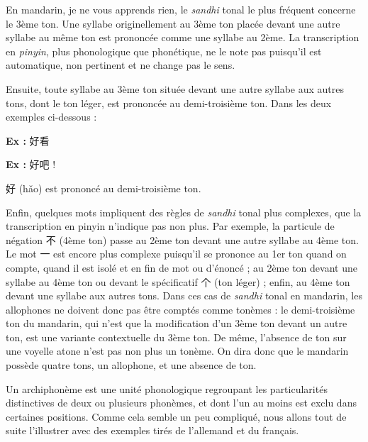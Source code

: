 En mandarin, je ne vous apprends rien, le \textit{sandhi} tonal le plus fréquent concerne le 3ème ton. Une syllabe originellement au 3ème ton placée devant une autre syllabe au même ton est prononcée comme une syllabe au 2ème. La transcription en \textit{pinyin}, plus phonologique que phonétique, ne le note pas puisqu’il est automatique, non pertinent et ne change pas le sens.

Ensuite, toute syllabe au 3ème ton située devant une autre syllabe aux autres tons, dont le ton léger, est prononcée au demi-troisième ton. Dans les deux exemples ci-dessous :

\noindent\textbf{Ex :} 好看

\noindent\textbf{Ex :} 好吧 !

好 (hǎo) est prononcé au demi-troisième ton.

Enfin, quelques mots impliquent des règles de \textit{sandhi} tonal plus complexes, que la transcription en pinyin n’indique pas non plus. Par exemple, la particule de négation 不 (4ème ton) passe au 2ème ton devant une autre syllabe au 4ème ton. Le mot 一 est encore plus complexe puisqu’il se prononce au 1er ton quand on compte, quand il est isolé et en fin de mot ou d’énoncé ; au 2ème ton devant une syllabe au 4ème ton ou devant le spécificatif 个 (ton léger) ; enfin, au 4ème ton devant une syllabe aux autres tons. Dans ces cas de \textit{sandhi} tonal en mandarin, les allophones ne doivent donc pas être comptés comme tonèmes : le demi-troisième ton du mandarin, qui n’est que la modification d’un 3ème ton devant un autre ton, est une variante contextuelle du 3ème ton. De même, l’absence de ton sur une voyelle atone n’est pas non plus un tonème. On dira donc que le mandarin possède quatre tons, un allophone, et une absence de ton.

Un archiphonème est une unité phonologique regroupant les particularités distinctives de deux ou plusieurs phonèmes, et dont l’un au moins est exclu dans certaines positions. Comme cela semble un peu compliqué, nous allons tout de suite l’illustrer avec des exemples tirés de l’allemand et du français.

